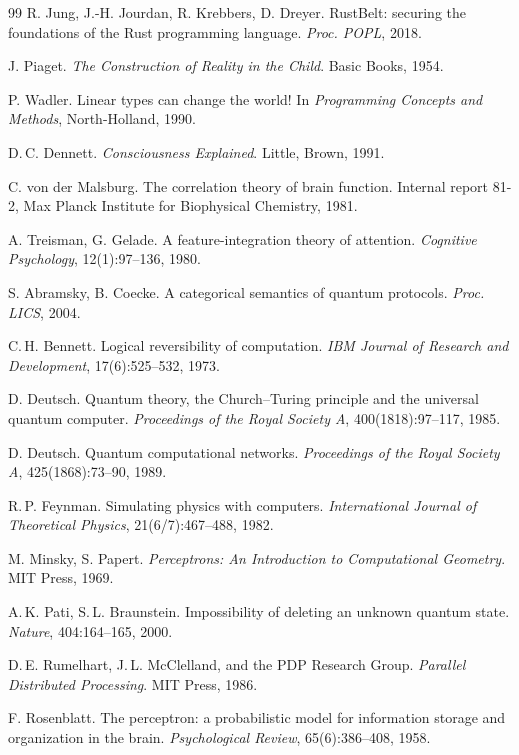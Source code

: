 \begin{thebibliography}{99}
R. Jung, J.-H. Jourdan, R. Krebbers, D. Dreyer. RustBelt:
securing the foundations of the Rust programming language. \emph{Proc. POPL},
2018.

J. Piaget. \emph{The Construction of Reality in the Child}.
Basic Books, 1954.

P. Wadler. Linear types can change the world! In
\emph{Programming Concepts and Methods}, North-Holland, 1990.

D.\,C. Dennett. \emph{Consciousness Explained}. Little,
Brown, 1991.

C. von der Malsburg. The correlation theory of brain
function. Internal report 81-2, Max Planck Institute for Biophysical Chemistry,
1981.

A. Treisman, G. Gelade. A feature-integration theory of
attention. \emph{Cognitive Psychology}, 12(1):97--136, 1980.

S. Abramsky, B. Coecke. A categorical semantics of
quantum protocols. \emph{Proc. LICS}, 2004.

C.\,H. Bennett. Logical reversibility of computation.
\emph{IBM Journal of Research and Development}, 17(6):525--532, 1973.

D. Deutsch. Quantum theory, the Church--Turing principle and
the universal quantum computer. \emph{Proceedings of the Royal Society A},
400(1818):97--117, 1985.

D. Deutsch. Quantum computational networks.
\emph{Proceedings of the Royal Society A}, 425(1868):73--90, 1989.

R.\,P. Feynman. Simulating physics with computers.
\emph{International Journal of Theoretical Physics}, 21(6/7):467--488, 1982.

M. Minsky, S. Papert. \emph{Perceptrons: An Introduction to
Computational Geometry}. MIT Press, 1969.

A.\,K. Pati, S.\,L. Braunstein. Impossibility of deleting an
unknown quantum state. \emph{Nature}, 404:164--165, 2000.

D.\,E. Rumelhart, J.\,L. McClelland, and the PDP Research Group.
\emph{Parallel Distributed Processing}. MIT Press, 1986.

F. Rosenblatt. The perceptron: a probabilistic model for
information storage and organization in the brain. \emph{Psychological Review},
65(6):386--408, 1958.


\end{thebibliography}
